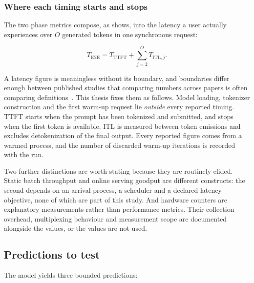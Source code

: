 \subsubsection{Where each timing starts and stops}

The two phase metrics compose, as  shows, into the
latency a user actually experiences over \(O\) generated tokens in one
synchronous request:

\begin{equation}
\label{eq:e2e}
  T_{\mathrm{E2E}}
  =
  T_{\mathrm{TTFT}} +
  \sum_{j=2}^{O} T_{\mathrm{ITL},j}.
\end{equation}

A latency figure is meaningless without its boundary, and boundaries
differ enough between published studies that comparing numbers across
papers is often comparing definitions~\cite{agrawal2025evaluating}.
This thesis fixes them as follows.  Model loading, tokenizer
construction and the first warm-up request lie \emph{outside} every
reported timing.  TTFT starts when the prompt has been tokenized and
submitted, and stops when the first token is available.  ITL is
measured between token emissions and excludes detokenization of the
final output.  Every reported figure comes from a warmed process, and
the number of discarded warm-up iterations is recorded with the run.

Two further distinctions are worth stating because they are routinely
elided.  Static batch throughput and online serving goodput are
different constructs: the second depends on an arrival process, a
scheduler and a declared latency objective, none of which are part of
this study.  And hardware counters are explanatory measurements rather
than performance metrics.  Their collection overhead, multiplexing
behaviour and measurement scope are documented alongside the values, or
the values are not used.

\subsection{Predictions to test}

The model yields three bounded predictions:

